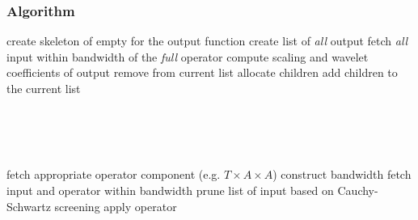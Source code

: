 \begin{frame}
    \frametitle{Algorithm}
    \begin{algorithmic}[1]
        \STATE create \tree skeleton of empty \nodes for the output function
        \STATE create list of \emph{all} output \nodes
                \STATE fetch \emph{all} input \nodes within bandwidth of the \emph{full} operator
                \STATE compute scaling and wavelet coefficients of output \node
            \ENDFOR
                \STATE remove \node from current list
                    \STATE allocate children \nodes
                    \STATE add children \nodes to the current list
                \ENDIF
            \ENDFOR
        \ENDWHILE
    \end{algorithmic}
    \ \\
    \ \\
    \ \\
    \pause
    \begin{algorithmic}[1]
                    \STATE fetch appropriate operator component (e.g. $T\times A\times A$)
                    \STATE construct bandwidth
                    \STATE fetch input and operator \nodes within bandwidth
                    \STATE prune list of input \nodes based on Cauchy-Schwartz screening
                        \STATE apply operator
                    \ENDFOR
                \ENDFOR
            \ENDFOR
        \ENDFOR         
    \end{algorithmic}
\end{frame}


